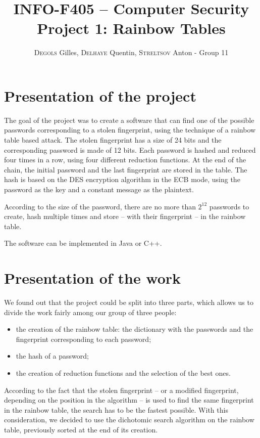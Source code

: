 \documentclass[a4paper,11pt]{article}
\title{INFO-F405 – Computer Security\\Project 1: Rainbow Tables}
\author{\textsc{Degols} Gilles, \textsc{Delhaye} Quentin, \textsc{Streltsov} Anton - Group 11}
\begin{document}
\maketitle

\section{Presentation of the project}
The goal of the project was to create a software that can find one of the possible passwords corresponding to a stolen fingerprint, using the technique of a rainbow table based attack. The stolen fingerprint has a size of 24 bits and the corresponding password is made of 12 bits. Each password is hashed and reduced four times in a row, using four different reduction functions. At the end of the chain, the initial password and the last fingerprint are stored in the table. The hash is based on the DES encryption algorithm in the ECB mode, using the password as the key and a constant message as the plaintext.

According to the size of the password, there are no more than $2^{12}$ 
passwords to create, hash multiple times and store – with their fingerprint – in the rainbow table.

The software can be implemented in Java or C++.


\section{Presentation of the work}
We found out that the project could be split into three parts, which allows us to
divide the work fairly among our group of three people:
\begin{itemize}
\item the creation of the rainbow table: the dictionary with the passwords and the fingerprint corresponding to each password;
\item the hash of a password;
\item the creation of reduction functions and the selection of the best ones.
\end{itemize}

According to the fact that the stolen fingerprint – or a modified fingerprint,
depending on the position in the algorithm – is used to find the same fingerprint in the rainbow table, the search has to be the fastest possible. With this consideration, we decided to use the dichotomic search algorithm on the rainbow table, previously sorted at the end of its creation.
\end{document}
